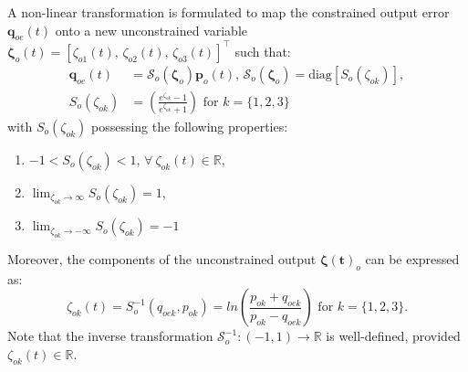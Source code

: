 \documentclass[lettersize,journal]{IEEEtran}
\begin{document}
A non-linear transformation is formulated to map the constrained output error $\boldsymbol{q}_{oe}(t)$ onto a new unconstrained variable $\boldsymbol{\zeta}_o(t) = [\zeta_{o1}(t),\, \zeta_{o2}(t),\, \zeta_{o3}(t)]^{\top}$ such that:
\begin{align}
    \label{error transformation for outer loop: equation}
    \boldsymbol{q}_{oe}(t) &= \mathcal{S}_o(\boldsymbol{\zeta}_o) \boldsymbol{p}_o(t), \, \mathcal{S}_o(\boldsymbol{\zeta}_o) = \text{diag}[S_o(\zeta_{ok})], \nonumber \\
    S_o(\zeta_{ok}) &= \left(\frac{e^{\zeta_{ok}} - 1}{e^{\zeta_{ok}} + 1} \right) \text{ for } k = \{1, 2, 3\}
\end{align}
with $S_o(\zeta_{ok})$ possessing the following properties:
\begin{enumerate}
    \item[I.] $ -1 < S_o(\zeta_{ok}) < 1 $, $\forall~\zeta_{ok}(t) \in \mathbb{R},$ 
    \item[II.] $\lim_{\zeta_{ok} \to \infty} S_o(\zeta_{ok}) = 1$,
    \item[III.] $\lim_{\zeta_{ok} \to -\infty} S_o(\zeta_{ok}) = -1$
\end{enumerate}

Moreover, the components of the unconstrained output $\boldsymbol{\zeta(t)}_o$ can be expressed as:
\begin{equation} \label{inverse transformation function for outer loop}
    \zeta_{ok}(t) = S_o^{-1}(q_{oe k}, p_{ok}) = ln \left(\frac{p_{ok} + q_{oe k}}{p_{ok} - q_{oe k}} \right) \text{ for } k = \{1, 2, 3\}.
\end{equation}
Note that the inverse transformation $\mathcal{S}_o^{-1}: (-1, 1) \to \mathbb{R}$ is well-defined, provided $\zeta_{ok}(t) \in \mathbb{R}$.
\end{document}
